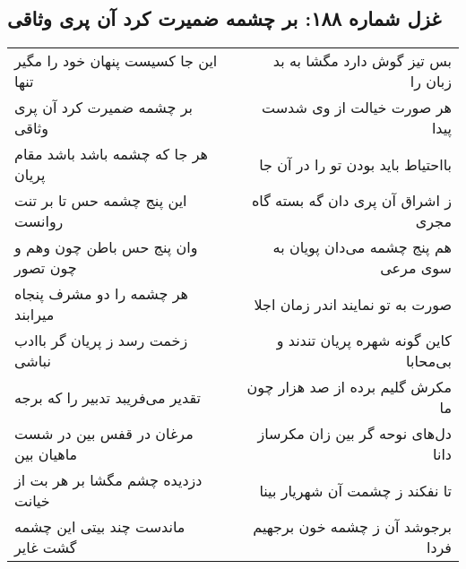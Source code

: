 \begin{center}
\section*{غزل شماره ۱۸۸: بر چشمه ضمیرت کرد آن پری وثاقی}
\label{sec:0188}
\begin{longtable}{l p{0.5cm} r}
این جا کسیست پنهان خود را مگیر تنها
&&
بس تیز گوش دارد مگشا به بد زبان را
\\
بر چشمه ضمیرت کرد آن پری وثاقی
&&
هر صورت خیالت از وی شدست پیدا
\\
هر جا که چشمه باشد باشد مقام پریان
&&
بااحتیاط باید بودن تو را در آن جا
\\
این پنج چشمه حس تا بر تنت روانست
&&
ز اشراق آن پری دان گه بسته گاه مجری
\\
وان پنج حس باطن چون وهم و چون تصور
&&
هم پنج چشمه می‌دان پویان به سوی مرعی
\\
هر چشمه را دو مشرف پنجاه میرابند
&&
صورت به تو نمایند اندر زمان اجلا
\\
زخمت رسد ز پریان گر باادب نباشی
&&
کاین گونه شهره پریان تندند و بی‌محابا
\\
تقدیر می‌فریبد تدبیر را که برجه
&&
مکرش گلیم برده از صد هزار چون ما
\\
مرغان در قفس بین در شست ماهیان بین
&&
دل‌های نوحه گر بین زان مکرساز دانا
\\
دزدیده چشم مگشا بر هر بت از خیانت
&&
تا نفکند ز چشمت آن شهریار بینا
\\
ماندست چند بیتی این چشمه گشت غایر
&&
برجوشد آن ز چشمه خون برجهیم فردا
\\
\end{longtable}
\end{center}
